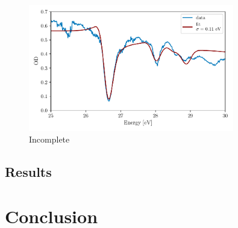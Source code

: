 \begin{figure}
	\centering
	\includegraphics[width=0.8\textwidth]{figures/ATS/fano_fit.pdf}
	\caption{Incomplete}
	\label{fig:fano_fit}
\end{figure}

\subsection{Results}
\label{sec:ATS_ar_results}

\section{Conclusion}
\label{sec:ATS_conclusion}

